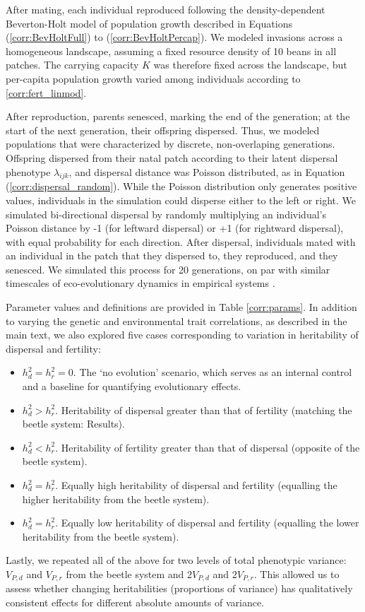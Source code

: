 \documentclass[11pt]{article}
\begin{document}
After mating, each individual reproduced following the density-dependent Beverton-Holt model of population growth described in Equations (\ref{corr:BevHoltFull}) to (\ref{corr:BevHoltPercap}).
We modeled invasions across a homogeneous landscape, assuming a fixed resource density of 10 beans in all patches. The carrying capacity $K$ was therefore fixed across the landscape, but per-capita population growth varied among individuals according to \ref{corr:fert_linmod}.

After reproduction, parents senesced, marking the end of the generation; at the start of the next generation, their offspring dispersed.
Thus, we modeled populations that were characterized by discrete, non-overlaping generations.
Offspring dispersed from their natal patch according to their latent dispersal phenotype $\lambda_{ijk}$, and dispersal distance was Poisson distributed, as in Equation (\ref{corr:dispersal_random}).
While the Poisson distribution only generates positive values, individuals in the simulation could disperse either to the left or right. We simulated bi-directional dispersal by randomly multiplying an individual's Poisson distance by -1 (for leftward dispersal) or +1 (for rightward dispersal), with equal probability for each direction.
After dispersal, individuals mated with an individual in the patch that they dispersed to, they reproduced, and they senesced.
We simulated this process for 20 generations, on par with similar timescales of eco-evolutionary dynamics in empirical systems \citep{williams_rapid_2016,ochocki_rapid_2017,weiss-lehman_rapid_2017}.

Parameter values and definitions are provided in Table \ref{corr:params}. In addition to varying the genetic and environmental trait correlations, as described in the main text, we also explored five cases corresponding to variation in heritability of dispersal and fertility:
\begin{itemize}
  \item $h^{2}_d = h^{2}_r = 0$. The `no evolution' scenario, which serves as an internal control and a baseline for quantifying evolutionary effects.
  \item $h^{2}_d > h^{2}_r$. Heritability of dispersal greater than that of fertility (matching the beetle system: Results).
  \item $h^{2}_d < h^{2}_r$. Heritability of fertility greater than that of dispersal (opposite of the beetle system).
  \item $h^{2}_d = h^{2}_r$. Equally high heritability of dispersal and fertility (equalling the higher heritability from the beetle system).
  \item $h^{2}_d = h^{2}_r$. Equally low heritability of dispersal and fertility (equalling the lower heritability from the beetle system).
\end{itemize}
Lastly, we repeated all of the above for two levels of total phenotypic variance: $V_{P,d}$ and $V_{P,r}$ from the beetle system and $2V_{P,d}$ and $2V_{P,r}$.
This allowed us to assess whether changing heritabilities (proportions of variance) has qualitatively consistent effects for different absolute amounts of variance.
\end{document}
